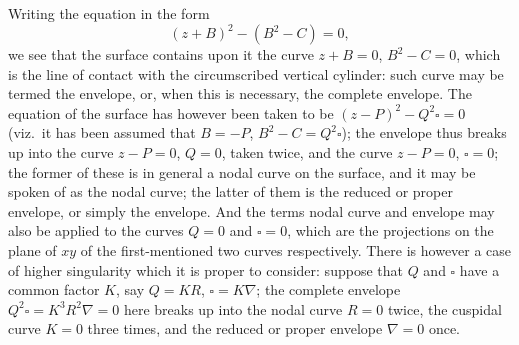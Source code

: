 \documentclass[11pt,a4paper]{article}
\theoremstyle{plain}
\begin{document}
Writing the equation in the form
\[
(z + B)^2 - (B^2 - C) = 0,
\]
we see that the surface contains upon it the curve $z + B = 0$, $B^2 - C = 0$, which is the line of contact with the circumscribed vertical cylinder: such curve may be termed the envelope, or, when this is necessary, the complete envelope. The equation of the surface has however been taken to be $(z - P)^2 - Q^2 \square = 0$ (viz.\ it has been assumed that $B = -P$, $B^2 - C = Q^2 \square$); the envelope thus breaks up into the curve $z - P = 0$, $Q = 0$, taken twice, and the curve $z - P = 0$, $\square = 0$; the former of these is in general a nodal curve on the surface, and it may be spoken of as the nodal curve; the latter of them is the reduced or proper envelope, or simply the envelope. And the terms nodal curve and envelope may also be applied to the curves $Q = 0$ and $\square = 0$, which are the projections on the plane of $xy$ of the first-mentioned two curves respectively. There is however a case of higher singularity which it is proper to consider: suppose that $Q$ and $\square$ have a common factor $K$, say $Q = K R$, $\square = K \nabla$; the complete envelope $Q^2 \square = K^3 R^2 \nabla = 0$ here breaks up into the nodal curve $R = 0$ twice, the cuspidal curve $K = 0$ three times, and the reduced or proper envelope $\nabla = 0$ once.
\end{document}
